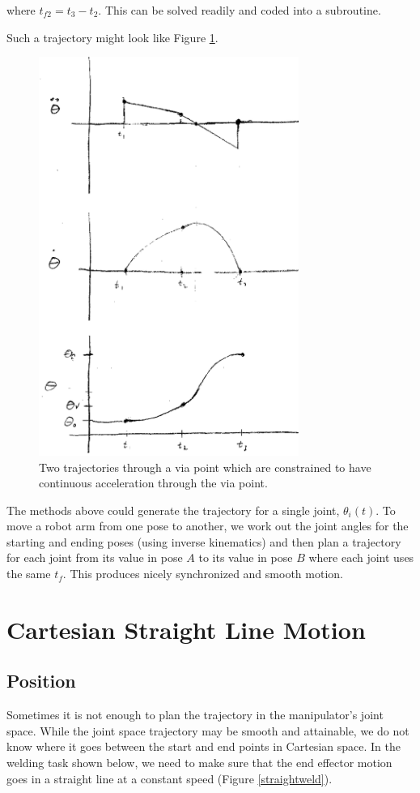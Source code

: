 where $t_{f2} = t_3-t_2$.    This can be solved readily and coded into a subroutine.

Such a trajectory might look like Figure \ref{continuousacceleration}.


\begin{figure}\centering
\includegraphics[width= 8.5cm]{figs07/00516.eps}
\caption{Two trajectories through a via point which are constrained to have continuous acceleration through the via point.}\label{continuousacceleration}
\end{figure}




The methods above could generate the trajectory for  a single joint, $\theta_i(t)$.   To move a robot arm from one pose to another, we work out the joint angles for the starting and ending poses (using inverse kinematics) and then plan a trajectory for each joint from its value in pose $A$ to its value in pose $B$ where each joint uses the same $t_f$.  This produces nicely synchronized and smooth motion.


\section{Cartesian Straight Line Motion}

\subsection{Position}
Sometimes it is not enough to plan the trajectory in the manipulator's joint space.   While the joint space trajectory may be smooth and attainable, we do not know where it goes between the start and end points in Cartesian space.  In the welding task shown below,  we need to make sure that the end effector motion goes in a straight line at a constant speed (Figure \ref{straightweld}).


